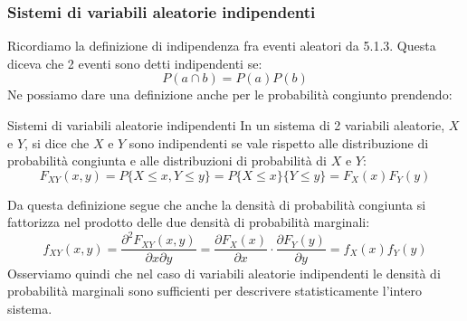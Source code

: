 \documentclass[a4paper,11pt]{article}
\begin{document}
\subsubsection{Sistemi di variabili aleatorie indipendenti}
Ricordiamo la definizione di indipendenza fra eventi aleatori da 5.1.3. Questa diceva che 2 eventi sono detti indipendenti se:
$$
P(a \cap b) = P(a) P(b)
$$
Ne possiamo dare una definizione anche per le probabilità congiunto prendendo:
\begin{definition}{Sistemi di variabili aleatorie indipendenti}
In un sistema di 2 variabili aleatorie, $X$ e $Y$, si dice	che $X$ e $Y$ sono indipendenti se vale rispetto alle distribuzione di probabilità congiunta e alle distribuzioni di probabilità di $X$ e $Y$:
$$
F_{XY}(x, y) = P\{X \leq x, Y \leq y\} = P\{X \leq x\}\{Y \leq y\} = F_X(x) F_Y(y)
$$
\end{definition}
Da questa definizione segue che anche la densità di probabilità congiunta si fattorizza nel prodotto delle due densità di probabilità marginali:
$$
f_{XY}(x, y) = \frac{\partial^2 F_{XY}(x, y)}{\partial x \partial y} = \frac{\partial F_X (x)}{\partial x} \cdot \frac{\partial F_Y (y)}{\partial y} = f_X(x) f_Y(y)
$$
Osserviamo quindi che nel caso di variabili aleatorie indipendenti le densità di probabilità marginali sono sufficienti per descrivere statisticamente l'intero sistema.
\end{document}
